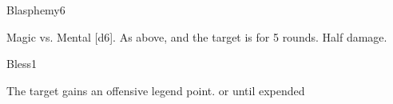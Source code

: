 \begin{spellsection}{Blasphemy}{6}
    \begin{spellheader}
    \end{spellheader}
    \begin{spellcontent}
        \begin{spelltargetinginfo}
        \end{spelltargetinginfo}
        \begin{spelleffects}
            \begin{spellattack}{Magic vs. Mental}
                \spellsuccess {}[d6].
                \spellcritical As above, and the target is \staggered for 5 rounds.
                \spellfailure Half damage.
            \end{spellattack}
        \end{spelleffects}
    \end{spellcontent}
    \begin{spellfooter}
        \miscastexplode
    \end{spellfooter}
\end{spellsection}

\begin{spellsection}{Bless}{1}
    \begin{spellheader}
    \end{spellheader}
    \begin{spellcontent}
        \begin{spelltargetinginfo}
        \end{spelltargetinginfo}
        \begin{spelleffects}
            \spelleffect The target gains an offensive legend point.
            \spelldur \durshort or until expended
        \end{spelleffects}
    \end{spellcontent}
    \begin{spellfooter}
        \miscastrandom
    \end{spellfooter}
\end{spellsection}

